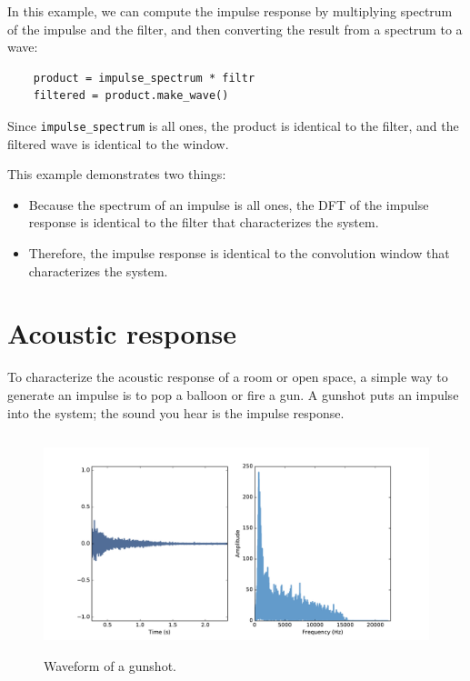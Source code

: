 \documentclass[12pt]{book}
\begin{document}
In this example, we can compute the impulse response by multiplying
spectrum of the impulse and the filter, and then converting the result
from a spectrum to a wave:

\begin{verbatim}
    product = impulse_spectrum * filtr
    filtered = product.make_wave()
\end{verbatim}

Since \verb"impulse_spectrum" is all ones, the product is
identical to the filter, and the filtered wave is identical to the
window.

This example demonstrates two things:

\begin{itemize}

\item Because the spectrum of an impulse is all ones, the DFT
of the impulse response is identical to the filter that
characterizes the system.

\item Therefore, the impulse response is identical to the
convolution window that characterizes the system.

\end{itemize}


\section{Acoustic response}
\label{response}

To characterize the acoustic response of a room or open space, a
simple way to generate an impulse is to pop a balloon or
fire a gun.  A gunshot puts an impulse into
the system; the sound you hear is the impulse response.

\begin{figure}
\centerline{\includegraphics[height=2.5in]{figs/systems6.pdf}}
\caption{Waveform of a gunshot.}
\label{fig.systems6}
\end{figure}
\end{document}
